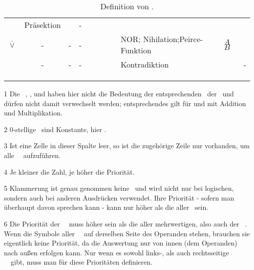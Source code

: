 \begin{table}[p]
\begin{threeparttable}
\begin{tabularx}{\linewidth}{|c||c:cc:cccc|X:X|c|}
			& Präsektion
			& & - \\
			\tableline%
			 $\overline\lor$
			& - & - & - &\textfalse&\textfalse&\textfalse&\texttrue
			& NOR; Nihilation;\newline Peirce-Funktion
			&  $A$  $B$ & \thepnor \\
			\tableline%
			& - & - & - &\textfalse&\textfalse&\textfalse&\textfalse
			& Kontradiktion
			& & - \\
			\hline%
			\ifmarginparFlg\else
			 \\
			 \\
			\fi
			 \\
			\hline%
		\end{tabularx}
		\begin{tablenotes}
			\footnotesize
			\item[1] Die \Junktoren\ \chrqt{$\subset$}, \chrqt{$\supset$}, \chrqt{$\nsubset$} und  haben hier nicht die Bedeutung der entsprechenden \Operationen\ der \Mengenlehre\ und dürfen nicht damit verwechselt werden; entsprechendes gilt für \chrqt{$+$} und \chrqt{$\cdot$} mit Addition und Multiplikation.
			\item[2] 0-stellige \Junktoren\ sind Konstante, hier \emph{\Wahrheitswerte}.
			\item[3] Ist eine Zelle in dieser Spalte leer, so ist die zugehörige Zeile nur vorhanden, um alle \binaeren\ \Junktoren\ aufzuführen.
			\item[4] Je kleiner die Zahl, je höher die Priorität.
			\item[5] Klammerung ist genau genommen keine \Operation\ und wird nicht nur bei logischen, sondern auch bei anderen Ausdrücken verwendet. Ihre Priorität - sofern man überhaupt davon sprechen kann - kann nur höher als die aller \Junktoren\ sein.
			\item[6] Die Priorität der \unaeren\ \Operationen\ muss höher sein als die aller mehrwertigen, also auch der \binaeren\ \Operationen.
			Wenn die Symbole aller \unaeren\ \Operationen\ auf derselben Seite des Operanden stehen, brauchen sie eigentlich keine Priorität, da die Auswertung nur von innen (dem Operanden) nach außen erfolgen kann.
			Nur wenn es sowohl links-, als auch rechtsseitige \unaere\ \Operationen\ gibt, muss man für diese Prioritäten definieren.
		\end{tablenotes}
	\end{threeparttable}
	\caption{Definition von \aussagenlogischenSymbolen.}
	\label{tab:Symbole}%
\end{table}
\ifmarginparFlg\alleMoeglichenJunktoren\else\fi


